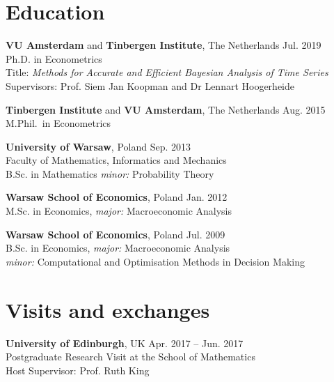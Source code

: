\documentclass[margin,line]{resume}
\begin{document}
\begin{resume}
    \section{\mysidestyle Education}
    \textbf{VU Amsterdam} and \textbf{Tinbergen Institute},  The Netherlands \hfill Jul. 2019\\
	Ph.D. in Econometrics\\
	Title: \textit{Methods for Accurate and Efficient Bayesian Analysis of Time Series}\\ 
    Supervisors: Prof. Siem Jan Koopman and Dr Lennart Hoogerheide
\vspace{-2mm}

    \textbf{Tinbergen Institute} and \textbf{VU Amsterdam}, The Netherlands  \hfill Aug. 2015 	\\
	M.Phil.\ in Econometrics
	\vspace{-2mm}

	\textbf{University of Warsaw}, Poland  \hfill Sep. 2013 	\\
	Faculty of Mathematics, Informatics and Mechanics \\B.Sc. in Mathematics		\textit{minor:} Probability Theory 
\vspace{-2mm}

	\textbf{Warsaw School of Economics}, Poland   \hfill  Jan. 2012\\
	M.Sc. in Economics, \textit{major:} Macroeconomic Analysis
\vspace{-2mm}

 	\textbf{Warsaw School of Economics}, Poland  \hfill  Jul. 2009\\
   	B.Sc. in Economics, \textit{major:} Macroeconomic Analysis\\ 
    \textit{minor:} Computational and Optimisation Methods in Decision Making\\

\vspace{-5mm}
    
\section{\mysidestyle Visits and exchanges}
    \textbf{University of Edinburgh},  UK \hfill Apr. 2017 -- Jun. 2017\\
	Postgraduate Research Visit at the School of Mathematics\\ 
    Host Supervisor: Prof. Ruth King
  
    \vspace{-1mm}


\end{resume}
\end{document}
